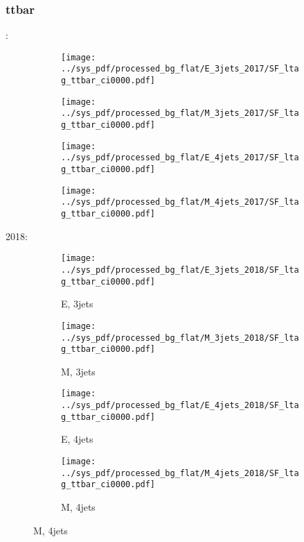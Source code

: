 \documentclass{beamer}
\begin{document}
\begin{frame}
\frametitle{ttbar}
\fontsize{5}{1}:
\begin{figure}
\centering
\begin{subfigure}[b]{0.24\textwidth}
\texttt{[image: ../sys\_pdf/processed\_bg\_flat/E\_3jets\_2017/SF\_ltag\_ttbar\_ci0000.pdf]}
\end{subfigure}
\begin{subfigure}[b]{0.24\textwidth}
\texttt{[image: ../sys\_pdf/processed\_bg\_flat/M\_3jets\_2017/SF\_ltag\_ttbar\_ci0000.pdf]}
\end{subfigure}
\begin{subfigure}[b]{0.24\textwidth}
\texttt{[image: ../sys\_pdf/processed\_bg\_flat/E\_4jets\_2017/SF\_ltag\_ttbar\_ci0000.pdf]}
\end{subfigure}
\begin{subfigure}[b]{0.24\textwidth}
\texttt{[image: ../sys\_pdf/processed\_bg\_flat/M\_4jets\_2017/SF\_ltag\_ttbar\_ci0000.pdf]}
\end{subfigure}
\end{figure}
2018:
\begin{figure}
\centering
\begin{subfigure}[b]{0.24\textwidth}
\texttt{[image: ../sys\_pdf/processed\_bg\_flat/E\_3jets\_2018/SF\_ltag\_ttbar\_ci0000.pdf]}
\captionsetup{font=tiny}
\caption{E, 3jets}
\end{subfigure}
\begin{subfigure}[b]{0.24\textwidth}
\texttt{[image: ../sys\_pdf/processed\_bg\_flat/M\_3jets\_2018/SF\_ltag\_ttbar\_ci0000.pdf]}
\captionsetup{font=tiny}
\caption{M, 3jets}
\end{subfigure}
\begin{subfigure}[b]{0.24\textwidth}
\texttt{[image: ../sys\_pdf/processed\_bg\_flat/E\_4jets\_2018/SF\_ltag\_ttbar\_ci0000.pdf]}
\captionsetup{font=tiny}
\caption{E, 4jets}
\end{subfigure}
\begin{subfigure}[b]{0.24\textwidth}
\texttt{[image: ../sys\_pdf/processed\_bg\_flat/M\_4jets\_2018/SF\_ltag\_ttbar\_ci0000.pdf]}
\captionsetup{font=tiny}
\caption{M, 4jets}
\end{subfigure}
\end{figure}
\end{frame}
\end{document}
